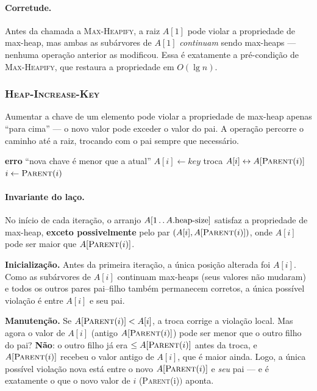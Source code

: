 \documentclass[9pt,a4paper]{extarticle}
\theoremstyle{definition}
\begin{document}
\paragraph{Corretude.} Antes da chamada a \textsc{Max-Heapify}, a raiz
$A[1]$ pode violar a propriedade de max-heap, mas ambas as subárvores de
$A[1]$ \textit{continuam} sendo max-heaps --- nenhuma operação anterior
as modificou. Essa é exatamente a pré-condição de \textsc{Max-Heapify},
que restaura a propriedade em $O(\lg n)$.
 
\subsubsection{\textsc{Heap-Increase-Key}}
 
Aumentar a chave de um elemento pode violar a propriedade de max-heap
apenas ``para cima'' --- o novo valor pode exceder o valor do pai. A
operação percorre o caminho até a raiz, trocando com o pai sempre que
necessário.
 
\begin{algorithm}[H]
\caption{\textsc{Heap-Increase-Key}$(A, i, \textit{key})$}
\begin{algorithmic}[1]
  \State \textbf{erro} ``nova chave é menor que a atual''
\EndIf
\State $A[i] \gets \textit{key}$
  \State troca $A[i] \leftrightarrow A[\textsc{Parent}(i)]$
  \State $i \gets \textsc{Parent}(i)$
\EndWhile
\end{algorithmic}
\end{algorithm}
 
\paragraph{Invariante do laço.} No início de cada iteração, o arranjo
$A[1\mathinner{.\,.} A.\text{heap-size}]$ satisfaz a propriedade de max-heap,
\textbf{exceto possivelmente} pelo par $(A[i], A[\textsc{Parent}(i)])$,
onde $A[i]$ pode ser maior que $A[\textsc{Parent}(i)]$.
 
\textbf{Inicialização.} Antes da primeira iteração, a única posição
alterada foi $A[i]$. Como as subárvores de $A[i]$ continuam max-heaps
(seus valores não mudaram) e todos os outros pares pai--filho também
permanecem corretos, a única possível violação é entre $A[i]$ e seu pai.
 
\textbf{Manutenção.} Se $A[\textsc{Parent}(i)] < A[i]$, a troca corrige a
violação local. Mas agora o valor de $A[i]$ (antigo $A[\textsc{Parent}(i)]$)
pode ser menor que o outro filho do pai? \textbf{Não}: o outro filho já
era $\le A[\textsc{Parent}(i)]$ antes da troca, e $A[\textsc{Parent}(i)]$
recebeu o valor antigo de $A[i]$, que é maior ainda. Logo, a única
possível violação nova está entre o novo $A[\textsc{Parent}(i)]$ e
\textit{seu} pai --- e é exatamente o que o novo valor de $i$
(\textsc{Parent}(i)$) $ aponta.
 
\end{document}
